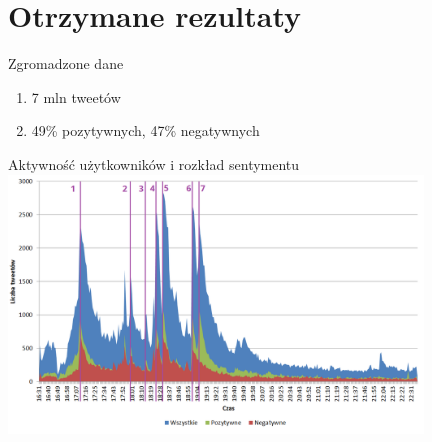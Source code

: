 \documentclass{beamer}
\begin{document}
\section{Otrzymane rezultaty}
\begin{frame}{Zgromadzone dane}
\begin{enumerate}
  \item 7 mln tweetów  
  \item 49\% pozytywnych, 47\% negatywnych
\end{enumerate}
\end{frame}
 



\begin{frame}{Aktywność użytkowników i rozkład sentymentu}
\includegraphics[width=11cm]{img/tweety-w-meczu-nums.png}
\end{frame}
\end{document}
